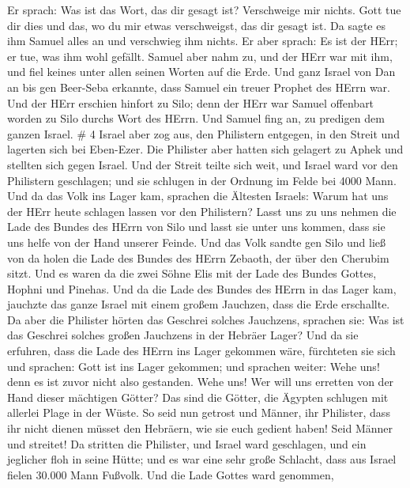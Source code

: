  Er sprach: Was ist das Wort, das dir gesagt ist?
Verschweige mir nichts. Gott tue dir dies und das, wo du mir etwas
verschweigst, das dir gesagt ist.  Da sagte es ihm Samuel
alles an und verschwieg ihm nichts. Er aber sprach: Es ist der HErr; er
tue, was ihm wohl gefällt.  Samuel aber nahm zu, und der
HErr war mit ihm, und fiel keines unter allen seinen Worten auf die
Erde.  Und ganz Israel von Dan an bis gen Beer-Seba
erkannte, dass Samuel ein treuer Prophet des HErrn war. 
Und der HErr erschien hinfort zu Silo; denn der HErr war Samuel
offenbart worden zu Silo durchs Wort des HErrn. Und Samuel fing an, zu
predigen dem ganzen Israel. \# 4  Israel aber zog aus, den
Philistern entgegen, in den Streit und lagerten sich bei Eben-Ezer. Die
Philister aber hatten sich gelagert zu Aphek  und stellten
sich gegen Israel. Und der Streit teilte sich weit, und Israel ward vor
den Philistern geschlagen; und sie schlugen in der Ordnung im Felde bei
4000 Mann.  Und da das Volk ins Lager kam, sprachen die
Ältesten Israels: Warum hat uns der HErr heute schlagen lassen vor den
Philistern? Lasst uns zu uns nehmen die Lade des Bundes des HErrn von
Silo und lasst sie unter uns kommen, dass sie uns helfe von der Hand
unserer Feinde.  Und das Volk sandte gen Silo und ließ von
da holen die Lade des Bundes des HErrn Zebaoth, der über den Cherubim
sitzt. Und es waren da die zwei Söhne Elis mit der Lade des Bundes
Gottes, Hophni und Pinehas.  Und da die Lade des Bundes des
HErrn in das Lager kam, jauchzte das ganze Israel mit einem großem
Jauchzen, dass die Erde erschallte.  Da aber die Philister
hörten das Geschrei solches Jauchzens, sprachen sie: Was ist das
Geschrei solches großen Jauchzens in der Hebräer Lager? Und da sie
erfuhren, dass die Lade des HErrn ins Lager gekommen wäre, 
fürchteten sie sich und sprachen: Gott ist ins Lager gekommen; und
sprachen weiter: Wehe uns! denn es ist zuvor nicht also gestanden.
 Wehe uns! Wer will uns erretten von der Hand dieser
mächtigen Götter? Das sind die Götter, die Ägypten schlugen mit allerlei
Plage in der Wüste.  So seid nun getrost und Männer, ihr
Philister, dass ihr nicht dienen müsset den Hebräern, wie sie euch
gedient haben! Seid Männer und streitet!  Da stritten die
Philister, und Israel ward geschlagen, und ein jeglicher floh in seine
Hütte; und es war eine sehr große Schlacht, dass aus Israel fielen
30.000 Mann Fußvolk.  Und die Lade Gottes ward genommen,
